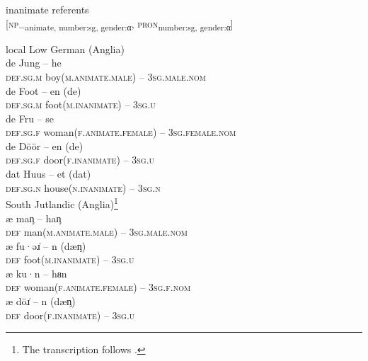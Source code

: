 \documentclass[output=paper]{langsci/langscibook}
\begin{document}
	\ex\label{ex:hoeder:12b}
	inanimate referents\\
       {[}\textsc{np}\textsc{\textsubscript{$-$}}\textsubscript{animate}\textsubscript{, number:sg, gender:}\textsubscript{α}, \textsc{pron}\textsubscript{number:sg, gender:}\textsubscript{α}{]}
       
    \z
\ex \label{ex:hoeder:13}
	local Low German (Anglia)\\
	\ea\label{ex:hoeder:13a}
	\gll de Jung – he\\
     \textsc{def.sg.m} boy(\textsc{m.animate.male}) – 3\textsc{sg.male.nom}\\

	\ex\label{ex:hoeder:13b}
	\gll de Foot – en (de)\\
     \textsc{def.sg.m}{} foot(\textsc{m.inanimate}) – 3\textsc{sg.u}\\

	\ex\label{ex:hoeder:13c}
	\gll de Fru – se\\
     \textsc{def.sg.f} woman(\textsc{f.animate.female}){} – 3\textsc{sg.female.nom}\\

	\ex\label{ex:hoeder:13d}
	\gll de Döör –{} en (de)\\
     \textsc{def.sg.f}{} door(\textsc{f.inanimate}) – 3\textsc{sg.u}\\

	\ex\label{ex:hoeder:13e}
	\gll dat Huus – et (dat)\\
     \textsc{def.sg.n} house(\textsc{n.inanimate}){} – 3\textsc{sg.n}\\
\z
\ex\label{ex:hoeder:14}
South Jutlandic (Anglia)\footnote{The transcription follows \citet{JulNielsen.1995}.}\\
	\ea\label{ex:hoeder:14a}	
	\gll æ maᶇ – haᶇ\\
     \textsc{def} man(\textsc{m.animate.male}){} – 3\textsc{sg.male.nom}\\

	\ex\label{ex:hoeder:14b}	
	\gll æ fu·əɹ̇ – n (dæᶇ)\\
     \textsc{def}{} foot(\textsc{m.inanimate}) – 3\textsc{sg.u}\\

	\ex\label{ex:hoeder:14c}	
	\gll æ ku·n – hᴕn\\
     \textsc{def} woman(\textsc{f.animate.female}) – 3\textsc{sg.f.nom}\\

	\ex\label{ex:hoeder:14d}	
	\gll æ döɹ̇ – n (dæᶇ)\\
     \textsc{def}{} door(\textsc{f.inanimate}) – 3\textsc{sg.u}\\
\end{document}
